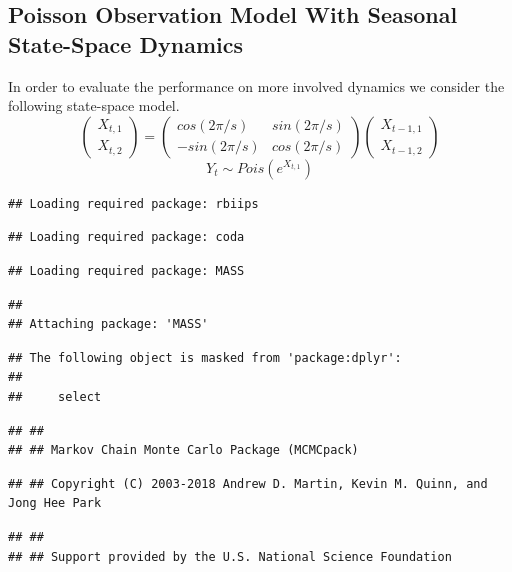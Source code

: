 \documentclass[]{article}
\begin{document}
\subsection{Poisson Observation Model With Seasonal State-Space
Dynamics}\label{poisson-observation-model-with-seasonal-state-space-dynamics}

In order to evaluate the performance on more involved dynamics we
consider the following state-space model.
\[\begin{pmatrix} X_{t,1} \\ X_{t,2} \end{pmatrix} = \begin{pmatrix} cos(2\pi/s) & sin(2\pi/s) \\ -sin(2\pi/s) & cos(2\pi/s) \end{pmatrix} \begin{pmatrix} X_{t-1,1} \\ X_{t-1,2} \end{pmatrix} \]
\[Y_t \sim Pois(e^{X_{t,1}})\]

\begin{verbatim}
## Loading required package: rbiips
\end{verbatim}

\begin{verbatim}
## Loading required package: coda
\end{verbatim}

\begin{verbatim}
## Loading required package: MASS
\end{verbatim}

\begin{verbatim}
## 
## Attaching package: 'MASS'
\end{verbatim}

\begin{verbatim}
## The following object is masked from 'package:dplyr':
## 
##     select
\end{verbatim}

\begin{verbatim}
## ##
## ## Markov Chain Monte Carlo Package (MCMCpack)
\end{verbatim}

\begin{verbatim}
## ## Copyright (C) 2003-2018 Andrew D. Martin, Kevin M. Quinn, and Jong Hee Park
\end{verbatim}

\begin{verbatim}
## ##
## ## Support provided by the U.S. National Science Foundation
\end{verbatim}
\end{document}
